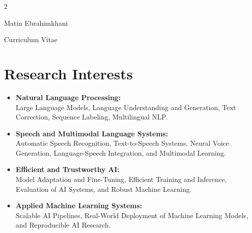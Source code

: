 \documentclass[
	8pt, %
]{FreemanCV}
\begin{document}
\begin{paracol}{2} %


\parbox[][0.11\textheight][c]{\linewidth}{ %
	\centering %
	
	{\sffamily\Huge Matin Ebrahimkhani} %
	
	\medskip %
	
	{\cursivefont\Huge\textcolor{headings}{Curriculum Vitae}}
	
	\vfill %
}

\section{Research Interests}

\begin{itemize}
    \item \textbf{Natural Language Processing:} 
          \\Large Language Models, Language Understanding and Generation, 
          Text Correction, Sequence Labeling, Multilingual NLP.

    \item \textbf{Speech and Multimodal Language Systems:} 
          \\Automatic Speech Recognition, Text-to-Speech Systems, 
          Neural Voice Generation, Language-Speech Integration, and Multimodal Learning.

    \item \textbf{Efficient and Trustworthy AI:} 
          \\Model Adaptation and Fine-Tuning, Efficient Training and Inference, 
          Evaluation of AI Systems, and Robust Machine Learning.

    \item \textbf{Applied Machine Learning Systems:} 
          \\Scalable AI Pipelines, Real-World Deployment of Machine Learning Models, 
          and Reproducible AI Research.
\end{itemize}


\end{paracol}
\end{document}
